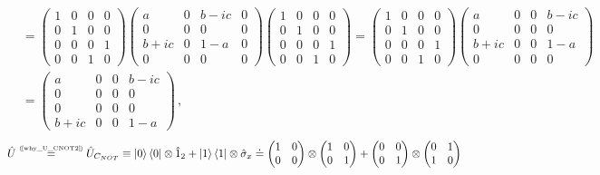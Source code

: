 \documentclass[11pt]{article}
\numberwithin{equation}{section} %
\numberwithin{figure}{section} %
\newcommand\numeq[1] %
  {\stackrel{\scriptscriptstyle(\mkern-1.5mu#1\mkern-1.5mu)}{=}}
\begin{document}
\begin{appendices}
\begin{equation}
\begin{split}
&=\begin{pmatrix}1&0&0&0\\0&1&0&0\\0&0&0&1\\0&0&1&0\end{pmatrix}\begin{pmatrix}a&0&b-ic&0\\0&0&0&0\\b+ic&0&1-a&0\\0&0&0&0\end{pmatrix}\begin{pmatrix}1&0&0&0\\0&1&0&0\\0&0&0&1\\0&0&1&0\end{pmatrix}=\begin{pmatrix}1&0&0&0\\0&1&0&0\\0&0&0&1\\0&0&1&0\end{pmatrix}\begin{pmatrix}a&0&0&b-ic\\0&0&0&0\\b+ic&0&0&1-a\\0&0&0&0\end{pmatrix}\\
&=\begin{pmatrix}a&0&0&b-ic\\0&0&0&0\\0&0&0&0\\b+ic&0&0&1-a\end{pmatrix}
\,\textrm{,}\end{split}
\end{equation}
\begin{equation} \label{U_CNOT_Appendix}
\begin{split}
\hat{U}
&\numeq{\textrm{\ref{why_U_CNOT2}}}\hat{U}_{C_{NOT}}\equiv\ket{0}\bra{0}\otimes\hat{1}_2+\ket{1}\bra{1}\otimes\hat{\sigma}_x\doteq \begin{pmatrix}1&0\\0&0\end{pmatrix}\otimes\begin{pmatrix}1&0\\0&1\end{pmatrix}+\begin{pmatrix}0&0\\0&1\end{pmatrix}\otimes\begin{pmatrix}0&1\\1&0\end{pmatrix} \\

\end{split}
\end{equation}
\end{appendices}
\end{document}
